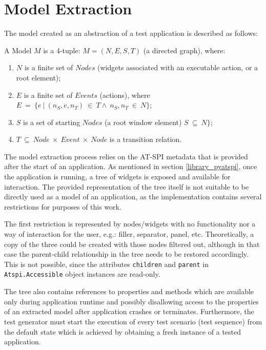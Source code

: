 \section{Model Extraction}
The model created as an abstraction of a test application is described as follows: 

\theoremstyle{definition}
\begin{definition}
A Model $M$ is a 4-tuple: $M = (N, E, S, T)$ (a directed graph), where:
\begin{enumerate}
\item $N$ is a finite set of $Nodes$ (widgets associated with an executable action, or a root element);
\item $E$ is a finite set of $Events$ (actions), where  $E\ =\ \{e\ |\ (n_S, e, n_T)\ \in\ T \land\ n_S,n_T\ \in \ N\}$;
\item $S$ is a set of starting $Nodes$ (a root window element)  $S\ \subseteq\ N\}$;
\item $T\ \subseteq\ Node\ \times \ Event\ \times \ Node$ is a transition relation.
\end{enumerate}
\end{definition}

The model extraction process relies on the AT-SPI metadata that is provided after the start of an application. As mentioned in section \ref{library_pyatspi}, once the application is running, a tree of widgets is exposed and available for interaction. The provided representation of the tree itself is not suitable to be directly used as a model of an application, as the implementation contains several restrictions for purposes of this work.

The first restriction is represented by nodes/widgets with no functionality nor a way of interaction for the user, e.g.: filler, separator, panel, etc. Theoretically, a copy of the three could be created with those nodes filtered out, although in that case the parent-child relationship in the tree needs to be restored accordingly. This is not possible, since the attributes \texttt{children} and \texttt{parent} in \texttt{Atspi.Accessible} object instances are read-only. 

The tree also contains references to properties and methods which are available only during application runtime and possibly disallowing access to the properties of an extracted model after application crashes or terminates. Furthermore, the test generator must start the execution of every test scenario (test sequence) from the default state which is achieved by obtaining a fresh instance of a tested application.


